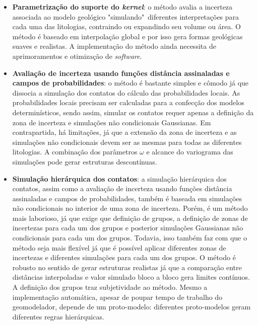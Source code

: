 \begin{itemize}
    \item \textbf{Parametrização do suporte do \textit{kernel}}: o método avalia a incerteza associada ao modelo geológico "simulando"\ diferentes interpretações para cada uma das litologias, contraindo ou expandindo seu volume ou área. O método é baseado em interpolação global e por isso gera formas geológicas suaves e realistas. A implementação do método ainda necessita de aprimoramentos e otimização de \textit{software}.
    \item \textbf{Avaliação de incerteza usando funções distância assinaladas e campos de probabilidades}: o método é bastante simples e cômodo já que dissocia a simulação dos contatos do cálculo das probabilidades locais. As probabilidades locais precisam ser calculadas para a confecção dos modelos determinísticos, sendo assim, simular os contatos requer apenas a definição da zona de incerteza e simulações não condicionais Gaussianas. Em contrapartida, há limitações, já que a extensão da zona de incerteza e as simulações não condicionais devem ser as mesmas para todas as diferentes litologias. A combinação dos parâmetros $\omega$ e alcance do variograma das simulações pode gerar estruturas descontínuas.
    \item \textbf{Simulação hierárquica dos contatos}: a simulação hierárquica dos contatos, assim como a avaliação de incerteza usando funções distância assinaladas e campos de probabilidades, também é baseada em simulações não condicionais no interior de uma zona de incerteza. Porém, é um método mais laborioso, já que exige que definição de grupos, a definição de zonas de incertezas para cada um dos grupos e posterior simulações Gaussianas não condicionais para cada um dos grupos. Todavia, isso também faz com que o método seja mais flexível já que é possível aplicar diferentes zonas de incertezas e diferentes simulações para cada um dos grupos. O método é robusto no sentido de gerar estruturas realistas já que a comparação entre distâncias interpoladas e valor simulado bloco a bloco gera limites contínuos. A definição dos grupos traz subjetividade ao método. Mesmo a implementação automática, apesar de poupar tempo de trabalho do geomodelador, depende de um proto-modelo: diferentes proto-modelos geram diferentes regras hierárquicas.

\end{itemize}
